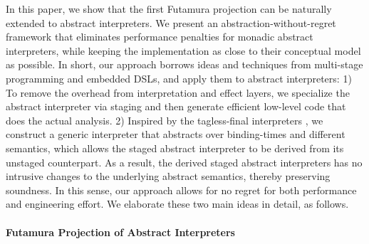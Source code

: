 In this paper, we show that the first Futamura projection can be naturally
extended to abstract interpreters. We present an abstraction-without-regret
framework that eliminates performance penalties for monadic abstract
interpreters, while keeping the implementation as close to their conceptual
model as possible.
In short, our approach borrows ideas and techniques from multi-stage
programming and embedded DSLs, and apply them to abstract interpreters:  1) To
remove the overhead from interpretation and effect layers, we specialize the
abstract interpreter via staging and then generate efficient low-level code
that does the actual analysis. 2) Inspired by the tagless-final interpreters
\cite{DBLP:journals/jfp/CaretteKS09}, we construct a generic interpreter that
abstracts over binding-times and different semantics, which allows the staged
abstract interpreter to be derived from its unstaged counterpart.  As a result,
the derived staged abstract interpreters has no intrusive changes to the
underlying abstract semantics, thereby preserving soundness.  In this
sense, our approach allows for no regret for both performance and engineering
effort. We elaborate these two main ideas in detail, as follows.




\paragraph{Futamura Projection of Abstract Interpreters}

